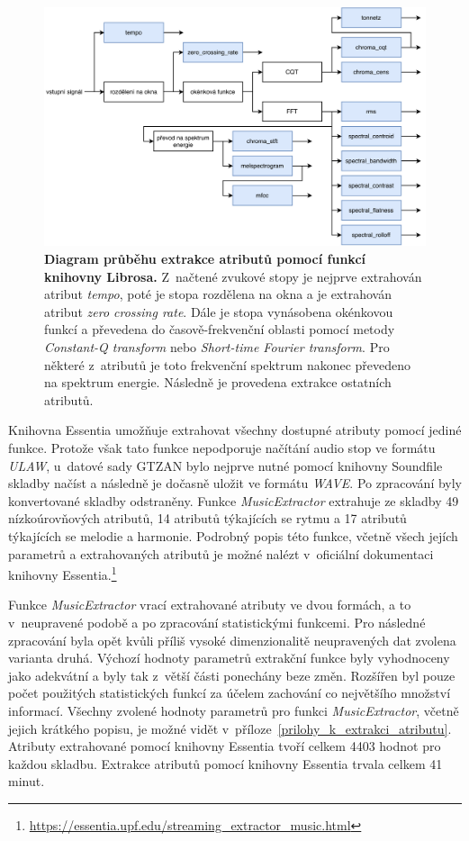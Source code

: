 \begin{figure}[h]
    \centering
    \includegraphics[width=\textwidth]{obrazky/librosa_extrakce.pdf}
    \caption{\textbf{Diagram průběhu extrakce atributů pomocí funkcí knihovny Librosa.} Z~načtené zvukové stopy je nejprve extrahován atribut \textit{tempo}, poté je stopa rozdělena na okna a je extrahován atribut \textit{zero crossing rate}. Dále je stopa vynásobena okénkovou funkcí a převedena do časově-frekvenční oblasti pomocí metody \textit{Constant-Q transform} nebo \textit{Short-time Fourier transform}. Pro některé z~atributů je toto frekvenční spektrum nakonec převedeno na spektrum energie. Následně je provedena extrakce ostatních atributů.}
    \label{obr_librosa_extrakce}
\end{figure}


Knihovna Essentia umožňuje extrahovat všechny dostupné atributy pomocí jediné funkce. Protože však tato funkce nepodporuje načítání audio stop ve formátu \textit{ULAW}, u~datové sady GTZAN bylo nejprve nutné pomocí knihovny Soundfile skladby načíst a následně je dočasně uložit ve formátu \textit{WAVE}. Po zpracování byly konvertované skladby odstraněny. Funkce \textit{MusicExtractor} extrahuje ze skladby 49 nízkoúrovňových atributů, 14 atributů týkajících se rytmu a 17 atributů týkajících se melodie a harmonie. Podrobný popis této funkce, včetně všech jejích parametrů a extrahovaných atributů je možné nalézt v~oficiální dokumentaci knihovny Essentia.\footnote{\url{https://essentia.upf.edu/streaming\_extractor\_music.html}} 

Funkce \textit{MusicExtractor} vrací extrahované atributy ve dvou formách, a to v~neupravené podobě a po zpracování statistickými funkcemi. Pro následné zpracování byla opět kvůli příliš vysoké dimenzionalitě neupravených dat zvolena varianta druhá. Výchozí hodnoty parametrů extrakční funkce byly vyhodnoceny jako adekvátní a byly tak z~větší části ponechány beze změn. Rozšířen byl pouze počet použitých statistických funkcí za účelem zachování co největšího množství informací. Všechny zvolené hodnoty parametrů pro funkci \textit{MusicExtractor}, včetně jejich krátkého popisu, je možné vidět v~příloze~\ref{prilohy_k_extrakci_atributu}. Atributy extrahované pomocí knihovny Essentia tvoří celkem 4403 hodnot pro každou skladbu. Extrakce atributů pomocí knihovny Essentia trvala celkem 41 minut.

